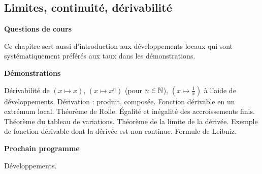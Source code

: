 






\subsection{Limites, continuité, dérivabilité}


\bigskip
\begin{center}
 \textbf{Questions de cours}
\end{center}
Ce chapitre sert aussi d'introduction aux développements locaux qui sont systématiquement préférés aux taux dans les démonstrations.

\textbf{Démonstrations}

Dérivabilité de $(x\mapsto x)$, $(x\mapsto x^n)$ (pour $n\in \mathbb{N}$), $(x\mapsto \frac{1}{x})$ à l'aide de développements.\newline
Dérivation : produit, composée.\newline
Fonction dérivable en un extrémum local. Théorème de Rolle.\newline
\'Egalité et inégalité des accroissements finis. Théorème du tableau de variations. Théorème de la limite de la dérivée.\newline
Exemple de fonction dérivable dont la dérivée est non continue.\newline
Formule de Leibniz.

\begin{center}
 \textbf{Prochain programme}
\end{center}
Développements.

